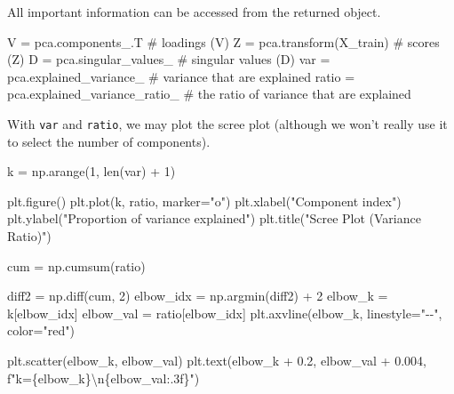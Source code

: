 \documentclass[
  letterpaper,
  DIV=11,
  numbers=noendperiod]{scrreprt}
\newenvironment{Shaded}{\begin{snugshade}}{\end{snugshade}}
\newcommand{\BuiltInTok}[1]{\textcolor[rgb]{0.00,0.23,0.31}{#1}}
\newcommand{\CharTok}[1]{\textcolor[rgb]{0.13,0.47,0.30}{#1}}
\newcommand{\CommentTok}[1]{\textcolor[rgb]{0.37,0.37,0.37}{#1}}
\newcommand{\DecValTok}[1]{\textcolor[rgb]{0.68,0.00,0.00}{#1}}
\newcommand{\FloatTok}[1]{\textcolor[rgb]{0.68,0.00,0.00}{#1}}
\newcommand{\NormalTok}[1]{\textcolor[rgb]{0.00,0.23,0.31}{#1}}
\newcommand{\OperatorTok}[1]{\textcolor[rgb]{0.37,0.37,0.37}{#1}}
\newcommand{\SpecialCharTok}[1]{\textcolor[rgb]{0.37,0.37,0.37}{#1}}
\newcommand{\SpecialStringTok}[1]{\textcolor[rgb]{0.13,0.47,0.30}{#1}}
\newcommand{\StringTok}[1]{\textcolor[rgb]{0.13,0.47,0.30}{#1}}
\theoremstyle{definition}
\theoremstyle{definition}
\theoremstyle{plain}
\theoremstyle{plain}
\theoremstyle{remark}
\newcommand*\circled[1]{\tikz[baseline=(char.base)]{
          \node[shape=circle,draw,inner sep=1pt] (char) {{\scriptsize#1}};}}
\begin{document}
All important information can be accessed from the returned object.

\begin{Shaded}
\begin{Highlighting}[]
\NormalTok{V }\OperatorTok{=}\NormalTok{ pca.components\_.T                   }\CommentTok{\# loadings (V)}
\NormalTok{Z }\OperatorTok{=}\NormalTok{ pca.transform(X\_train)              }\CommentTok{\# scores (Z)}
\NormalTok{D }\OperatorTok{=}\NormalTok{ pca.singular\_values\_                }\CommentTok{\# singular values (D)}
\NormalTok{var }\OperatorTok{=}\NormalTok{ pca.explained\_variance\_           }\CommentTok{\# variance that are explained}
\NormalTok{ratio }\OperatorTok{=}\NormalTok{ pca.explained\_variance\_ratio\_   }\CommentTok{\# the ratio of variance that are explained}
\end{Highlighting}
\end{Shaded}

With \texttt{var} and \texttt{ratio}, we may plot the scree plot
(although we won't really use it to select the number of components).

\protect{}\label{annotated-cell-93}%
\begin{Shaded}
\begin{Highlighting}[]
\NormalTok{k }\OperatorTok{=}\NormalTok{ np.arange(}\DecValTok{1}\NormalTok{, }\BuiltInTok{len}\NormalTok{(var) }\OperatorTok{+} \DecValTok{1}\NormalTok{)}

\NormalTok{plt.figure()}
\NormalTok{plt.plot(k, ratio, marker}\OperatorTok{=}\StringTok{"o"}\NormalTok{)}
\NormalTok{plt.xlabel(}\StringTok{"Component index"}\NormalTok{)}
\NormalTok{plt.ylabel(}\StringTok{"Proportion of variance explained"}\NormalTok{)}
\NormalTok{plt.title(}\StringTok{"Scree Plot (Variance Ratio)"}\NormalTok{)}

\NormalTok{cum }\OperatorTok{=}\NormalTok{ np.cumsum(ratio)}

\NormalTok{diff2 }\OperatorTok{=}\NormalTok{ np.diff(cum, }\DecValTok{2}\NormalTok{)}
\NormalTok{elbow\_idx }\OperatorTok{=}\NormalTok{ np.argmin(diff2) }\OperatorTok{+} \DecValTok{2}
\NormalTok{elbow\_k }\OperatorTok{=}\NormalTok{ k[elbow\_idx]}
\NormalTok{elbow\_val }\OperatorTok{=}\NormalTok{ ratio[elbow\_idx]}
\NormalTok{plt.axvline(elbow\_k, linestyle}\OperatorTok{=}\StringTok{"{-}{-}"}\NormalTok{, color}\OperatorTok{=}\StringTok{"red"}\NormalTok{) }\hspace*{\fill}\NormalTok{\circled{1}}

\NormalTok{plt.scatter(elbow\_k, elbow\_val)}
\NormalTok{plt.text(elbow\_k }\OperatorTok{+} \FloatTok{0.2}\NormalTok{, elbow\_val }\OperatorTok{+} \FloatTok{0.004}\NormalTok{, }\SpecialStringTok{f"k=}\SpecialCharTok{\{}\NormalTok{elbow\_k}\SpecialCharTok{\}}\CharTok{\textbackslash{}n}\SpecialCharTok{\{}\NormalTok{elbow\_val}\SpecialCharTok{:.3f\}}\SpecialStringTok{"}\NormalTok{)}
\end{Highlighting}
\end{Shaded}
\end{document}
